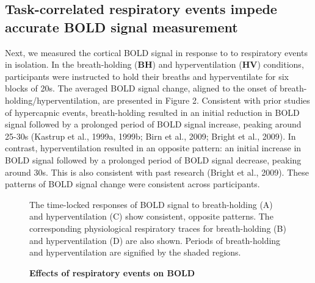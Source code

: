 \documentclass[9pt]{NEU502b-fmri}
\begin{document}
\subsection{Task-correlated respiratory events impede accurate BOLD signal measurement}
Next, we measured the cortical BOLD signal in response to to respiratory events in isolation. In the breath-holding (\textbf{BH}) and hyperventilation (\textbf{HV}) conditions, participants were instructed to hold their breaths and hyperventilate for six blocks of 20s. The averaged BOLD signal change, aligned to the onset of breath-holding/hyperventilation, are presented in Figure 2. Consistent with prior studies of hypercapnic events, breath-holding resulted in an initial reduction in BOLD signal followed by a prolonged period of BOLD signal increase, peaking around 25-30s (Kastrup et al., 1999a, 1999b; Birn et al., 2009; Bright et al., 2009). In contrast, hyperventilation resulted in an opposite pattern: an initial increase in BOLD signal followed by a prolonged period of BOLD signal decrease, peaking around 30s. This is also consistent with past research (Bright et al., 2009). These patterns of BOLD signal change were consistent across participants. 

\begin{figure}
\centerline{%
%
}
\caption{\textbf{Effects of respiratory events on BOLD}}
\par The time-locked responses of BOLD signal to breath-holding (A) and hyperventilation (C) show consistent, opposite patterns. The corresponding physiological respiratory traces for breath-holding (B) and hyperventilation (D) are also shown. Periods of breath-holding and hyperventilation are signified by the shaded regions.

\end{figure}
\end{document}
